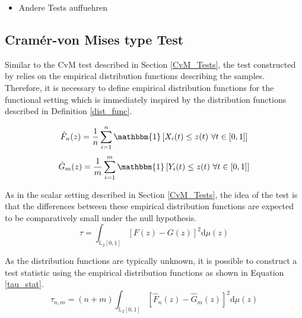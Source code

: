 \documentclass[12pt, a4paper]{article}
\theoremstyle{MAstyle} \newtheorem{assumption}{Assumption}[section]
\theoremstyle{MAstyle} \newtheorem{definition}{Definition}[section]
\theoremstyle{MAstyle} \newtheorem{theorem}{Theorem}[section]
\begin{document}
			\begin{itemize}
				\item {\color{red} Andere Tests auffuehren}
			\end{itemize}
		
		\subsection{Cram\'{e}r-von Mises type Test}\label{cvm_type_test}
			Similar to the CvM test described in Section \ref{CvM_Tests}, the test constructed by \cite{bugni_permutation_2021} relies on the empirical distribution functions describing the samples. 
			Therefore, it is necessary to define empirical distribution functions for the functional setting which is immediately inspired by the distribution functions described in Definition \ref{dist_func}.
			\begin{multicols}{2}
				\noindent
				\begin{equation*}
					\hat{F}_n(z) = \frac{1}{n} \sum_{i = 1}^{n}\mathbbm{1}\left[X_i(t) \leq z(t) \ \forall t \in [0,1]\right]
				\end{equation*}
				\begin{equation}
					\hat{G}_m(z) = \frac{1}{m} \sum_{i = 1}^{m}\mathbbm{1}\left[Y_i(t) \leq z(t) \ \forall t \in [0,1]\right]
				\end{equation}
			\end{multicols}
			
			As in the scalar setting described in Section \ref{CvM_Tests}, the idea of the test is that the differences between these empirical distribution functions are expected to be comparatively small under the null hypothesis.
			\begin{equation}
				\tau = \int_{\mathbb{L}_2[0,1]}\left[F(z) - G(z)\right]^2 \mathrm{d} \mu(z)
			\end{equation}
			
			As the distribution functions are typically unknown, it is possible to construct a test statistic using the empirical distribution functions as shown in Equation \ref{tau_stat}.
			\begin{equation}\label{tau_stat}
				\tau_{n,m} = (n+m) \int_{\mathbb{L}_2[0,1]}\left[\hat{F}_n(z) - \hat{G}_m(z)\right]^2 \mathrm{d} \mu(z)
			\end{equation}
		
\end{document}
